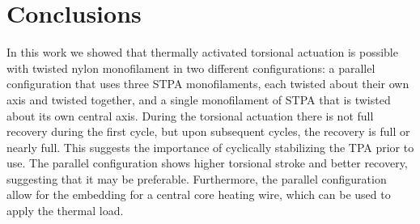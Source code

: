 \documentclass[twocolumn,10pt]{asme2e}
\begin{document}
\section{Conclusions}

In this work we showed that thermally activated torsional actuation is possible with twisted nylon monofilament in two different configurations: a parallel configuration that uses three STPA monofilaments, each twisted about their own axis and twisted together, and a single monofilament of STPA that is twisted about its own central axis. During the torsional actuation there is not full recovery during the first cycle, but upon subsequent cycles, the recovery is full or nearly full.  This suggests the importance of cyclically stabilizing the TPA prior to use.  The parallel configuration shows higher torsional stroke and better recovery, suggesting that it may be preferable.  Furthermore, the parallel configuration allow for the embedding for a central core heating wire, which can be used to apply the thermal load.





\end{document}

